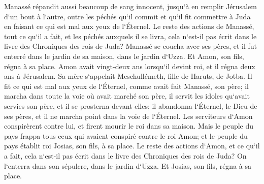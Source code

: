 \verse Manassé répandit aussi beaucoup de sang innocent, jusqu`à en remplir Jérusalem d`un bout à l`autre, outre les péchés qu`il commit et qu`il fit commettre à Juda en faisant ce qui est mal aux yeux de l`Éternel. 
\verse Le reste des actions de Manassé, tout ce qu`il a fait, et les péchés auxquels il se livra, cela n`est-il pas écrit dans le livre des Chroniques des rois de Juda? 
\verse Manassé se coucha avec ses pères, et il fut enterré dans le jardin de sa maison, dans le jardin d`Uzza. Et Amon, son fils, régna à sa place. 
\verse Amon avait vingt-deux ans lorsqu`il devint roi, et il régna deux ans à Jérusalem. Sa mère s`appelait Meschullémeth, fille de Haruts, de Jotba. 
\verse Il fit ce qui est mal aux yeux de l`Éternel, comme avait fait Manassé, son père; 
\verse il marcha dans toute la voie où avait marché son père, il servit les idoles qu`avait servies son père, et il se prosterna devant elles; 
\verse il abandonna l`Éternel, le Dieu de ses pères, et il ne marcha point dans la voie de l`Éternel. 
\verse Les serviteurs d`Amon conspirèrent contre lui, et firent mourir le roi dans sa maison. 
\verse Mais le peuple du pays frappa tous ceux qui avaient conspiré contre le roi Amon; et le peuple du pays établit roi Josias, son fils, à sa place. 
\verse Le reste des actions d`Amon, et ce qu`il a fait, cela n`est-il pas écrit dans le livre des Chroniques des rois de Juda? 
\verse On l`enterra dans son sépulcre, dans le jardin d`Uzza. Et Josias, son fils, régna à sa place. 

\chapter{}

